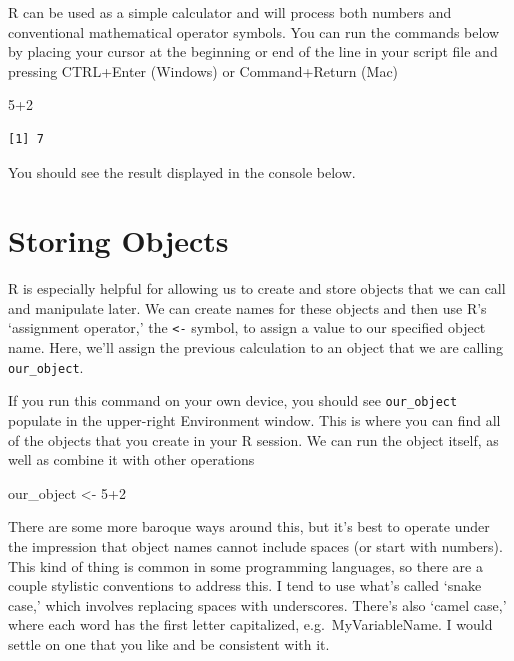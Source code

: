 \documentclass[
  letterpaper,
  DIV=11,
  numbers=noendperiod]{scrreprt}
\newenvironment{Shaded}{\begin{snugshade}}{\end{snugshade}}
\newcommand{\DecValTok}[1]{\textcolor[rgb]{0.68,0.00,0.00}{#1}}
\newcommand{\NormalTok}[1]{\textcolor[rgb]{0.00,0.23,0.31}{#1}}
\newcommand{\OtherTok}[1]{\textcolor[rgb]{0.00,0.23,0.31}{#1}}
\newcommand{\SpecialCharTok}[1]{\textcolor[rgb]{0.37,0.37,0.37}{#1}}
\begin{document}
R can be used as a simple calculator and will process both numbers and
conventional mathematical operator symbols. You can run the commands
below by placing your cursor at the beginning or end of the line in your
script file and pressing CTRL+Enter (Windows) or Command+Return (Mac)

\begin{Shaded}
\begin{Highlighting}[]
\DecValTok{5}\SpecialCharTok{+}\DecValTok{2}
\end{Highlighting}
\end{Shaded}

\begin{verbatim}
[1] 7
\end{verbatim}

You should see the result displayed in the console below.

\section{Storing Objects}\label{storing-objects}

R is especially helpful for allowing us to create and store objects that
we can call and manipulate later. We can create names for these objects
and then use R's `assignment operator,' the \texttt{\textless{}-}
symbol, to assign a value to our specified object name. Here, we'll
assign the previous calculation to an object that we are calling
\texttt{our\_object}.

If you run this command on your own device, you should see
\texttt{our\_object} populate in the upper-right Environment window.
This is where you can find all of the objects that you create in your R
session. We can run the object itself, as well as combine it with other
operations

\begin{Shaded}
\begin{Highlighting}[]
\NormalTok{our\_object }\OtherTok{\textless{}{-}} \DecValTok{5}\SpecialCharTok{+}\DecValTok{2}
\end{Highlighting}
\end{Shaded}

There are some more baroque ways around this, but it's best to operate
under the impression that object names cannot include spaces (or start
with numbers). This kind of thing is common in some programming
languages, so there are a couple stylistic conventions to address this.
I tend to use what's called `snake case,' which involves replacing
spaces with underscores. There's also `camel case,' where each word has
the first letter capitalized, e.g.~MyVariableName. I would settle on one
that you like and be consistent with it.
\end{document}
